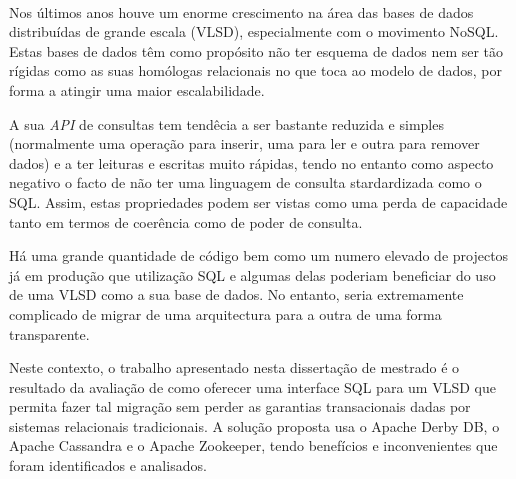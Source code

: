 
\paragraph{}

Nos últimos anos houve um enorme crescimento na área das bases de dados distribuídas de grande escala (VLSD), especialmente com o movimento NoSQL. Estas bases de dados têm  como propósito não ter esquema de dados nem ser tão rígidas como as suas homólogas relacionais no que toca ao modelo de dados, por forma a atingir uma maior escalabilidade.

A sua \emph{API} de consultas tem tendêcia a ser bastante reduzida e simples (normalmente uma operação para inserir, uma para ler e outra para remover dados) e a ter leituras e escritas muito rápidas, tendo no entanto como aspecto negativo o facto de não ter uma linguagem de consulta stardardizada como o SQL. Assim, estas propriedades podem ser vistas como uma perda de capacidade tanto em termos de coerência como de poder de consulta.

Há uma grande quantidade de código bem como um numero elevado de projectos já em produção que utilização SQL e algumas delas poderiam beneficiar do uso de uma VLSD como a sua base de dados. No entanto, seria extremamente complicado de migrar de uma arquitectura para a outra de uma forma transparente. 

Neste contexto, o trabalho apresentado nesta dissertação de mestrado é o resultado da avaliação de como oferecer uma interface SQL para um VLSD que permita fazer tal migração sem perder as garantias transacionais dadas por sistemas relacionais tradicionais. A solução proposta usa o Apache Derby DB, o Apache Cassandra e o Apache Zookeeper, tendo benefícios e inconvenientes que foram identificados e analisados.
